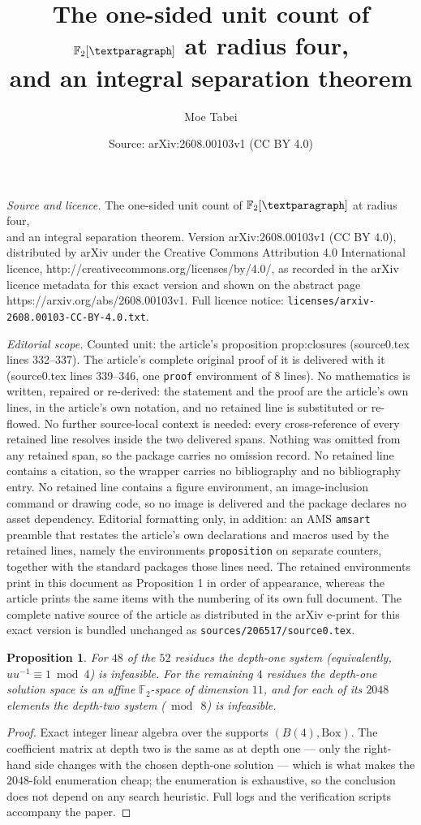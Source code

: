 \documentclass[10pt,a4paper]{amsart}
\title{The one-sided unit count of $\F_2[\P]$ at radius four,\\ and an integral separation theorem}
\author{Moe Tabei}
\date{Source: arXiv:2608.00103v1 (CC BY 4.0)}
\newtheorem{proposition}{Proposition}
\newcommand{\BOX}{\mathrm{Box}}
\newcommand{\Ball}[1]{B(#1)}
\newcommand{\F}{\mathbb{F}}
\begin{document}
\maketitle

\noindent\emph{Source and licence.} The one-sided unit count of $\F_2[\P]$ at radius four,\\ and an integral separation theorem. Version arXiv:2608.00103v1 (CC BY 4.0), distributed by arXiv under the Creative Commons Attribution 4.0 International licence, http://creativecommons.org/licenses/by/4.0/, as recorded in the arXiv licence metadata for this exact version and shown on the abstract page https://arxiv.org/abs/2608.00103v1. Full licence notice: \texttt{licenses/arxiv-2608.00103-CC-BY-4.0.txt}.\par\smallskip

\noindent\textit{Editorial scope.} Counted unit: the article's proposition prop:closures (source0.tex lines 332--337). The article's complete original proof of it is delivered with it (source0.tex lines 339--346, one \texttt{proof} environment of 8 lines). No mathematics is written, repaired or re-derived: the statement and the proof are the article's own lines, in the article's own notation, and no retained line is substituted or re-flowed.  No further source-local context is needed: every cross-reference of every retained line resolves inside the two delivered spans.  Nothing was omitted from any retained span, so the package carries no omission record.  No retained line contains a citation, so the wrapper carries no bibliography and no bibliography entry.  No retained line contains a figure environment, an image-inclusion command or drawing code, so no image is delivered and the package declares no asset dependency.  Editorial formatting only, in addition: an AMS \texttt{amsart} preamble that restates the article's own declarations and macros used by the retained lines, namely the environments \texttt{proposition} on separate counters, together with the standard packages those lines need.  The retained environments print in this document as Proposition 1 in order of appearance, whereas the article prints the same items with the numbering of its own full document.  The complete native source of the article as distributed in the arXiv e-print for this exact version is bundled unchanged as \texttt{sources/206517/source0.tex}.
\begin{proposition}\label{prop:closures}
For $48$ of the $52$ residues the depth-one system (equivalently,
$uu^{-1}\equiv1\bmod4$) is infeasible. For the remaining $4$ residues the
depth-one solution space is an affine $\F_2$-space of dimension $11$, and for
each of its $2048$ elements the depth-two system ($\bmod\ 8$) is infeasible.
\end{proposition}

\begin{proof}
Exact integer linear algebra over the supports $(\Ball4,\BOX)$. The
coefficient matrix at depth two is the same as at depth one --- only the
right-hand side changes with the chosen depth-one solution --- which is what
makes the $2048$-fold enumeration cheap; the enumeration is exhaustive, so the
conclusion does not depend on any search heuristic. Full logs and the
verification scripts accompany the paper.
\end{proof}
\end{document}
